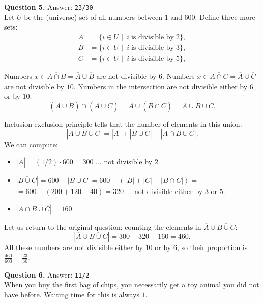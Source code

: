 \documentclass[jou]{apa6}
\begin{document}
\vspace{10pt}
{\bf Question 5.} Answer: {\tt 23/30}\\
Let $U$ be the (universe) set of all numbers between $1$ and $600$. 
Define three more sets:
\begin{align}
A & = \{ i \in U \,\mid\, i\;\text{is divisible by}\;2 \}, \nonumber \\
B & = \{ i \in U \,\mid\, i\;\text{is divisible by}\;3 \}, \nonumber \\
C & = \{ i \in U \,\mid\, i\;\text{is divisible by}\;5 \}, \nonumber 
\end{align}

Numbers $x \in \overline{A \cap B} = \overline{A} \cup \overline{B}$ 
are not divisible by $6$. Numbers 
$x \in \overline{A \cap C} = \overline{A} \cup \overline{C}$
are not divisible by $10$. Numbers in the intersection are not divisible
either by $6$ or by $10$:
$$(\overline{A} \cup \overline{B}) \cap (\overline{A} \cup \overline{C}) = 
\overline{A} \cup (\overline{B} \cap \overline{C}) = 
\overline{A} \cup \overline{B \cup C}.$$

Inclusion-exclusion principle tells that the number of elements in this union:
$$|\overline{A} \cup \overline{B \cup C}| = |\overline{A}| + 
|\overline{B \cup C}| - |\overline{A} \cap \overline{B \cup C}|.$$
We can compute:
\begin{itemize}
\item $|\overline{A}| = (1/2) \cdot 600 = 300$ ... not divisible by $2$.
\item $|\overline{B \cup C}| = 600 - |B \cup C| = 600 - (|B| + |C| - |B \cap C|) = $
$= 600 - (200 + 120 - 40) = 320$ ... not divisible either by $3$ or $5$.
\item $|\overline{A} \cap \overline{B \cup C}| = 160$.
\end{itemize}

Let us return to the original question: counting the elements 
in $\overline{A} \cup \overline{B \cup C}$:
$$|\overline{A} \cup \overline{B \cup C}| = 300 + 320 - 160 = 460.$$
All these numbers are not divisible either by $10$ or by $6$, so 
their proportion is $\frac{460}{600} = \frac{23}{30}$.


\vspace{10pt}
{\bf Question 6.} Answer: {\tt 11/2}\\

When you buy the first bag of chips, you necessarily get
a toy animal you did not have before. Waiting time for this is always $1$. 
\end{document}
